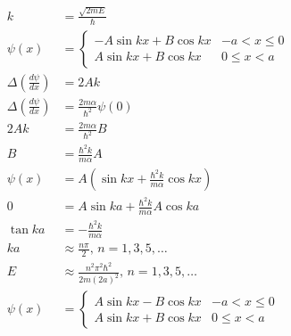 \documentclass{article}
\begin{document}
\begin{align*}
  k                                        & = \frac{\sqrt{2 m E}}{\hbar}                                         \\
  \psi(x)                                  & = \begin{cases}
                                                 -A \sin k x + B \cos k x & -a < x \le 0 \\
                                                 A \sin k x + B \cos k x  & 0 \le x < a
                                               \end{cases}                            \\
  \Delta \left( \frac{d \psi}{d x} \right) & = 2 A k                                                              \\
  \Delta \left( \frac{d \psi}{d x} \right) & = \frac{2 m \alpha}{\hbar^2} \psi(0)                                 \\
  2 A k                                    & = \frac{2 m \alpha}{\hbar^2} B                                       \\
  B                                        & = \frac{\hbar^2 k}{m \alpha} A                                       \\
  \psi(x)                                  & = A \left( \sin k x + \frac{\hbar^2 k}{m \alpha} \cos k x \right)    \\
  0                                        & = A \sin k a + \frac{\hbar^2 k}{m \alpha} A \cos k a                 \\
  \tan k a                                 & = -\frac{\hbar^2 k}{m \alpha}                                        \\
  k a                                      & \approx \frac{n \pi}{2}, \,n = 1, 3, 5, \ldots                       \\
  E                                        & \approx \frac{n^2 \pi^2 \hbar^2}{2 m (2 a)^2}, \,n = 1, 3, 5, \ldots \\
  \psi(x)                                  & = \begin{cases}
                                                 A \sin k x - B \cos k x & -a < x \le 0 \\
                                                 A \sin k x + B \cos k x & 0 \le x < a
                                               \end{cases}                             \\

\end{align*}
\end{document}
